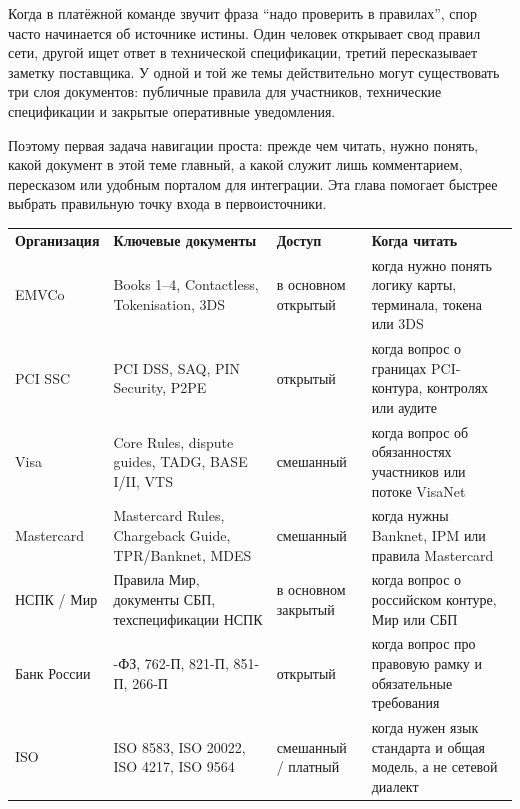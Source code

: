 
\label{ch:primary-sources}
Когда в платёжной команде звучит фраза \enquote{надо проверить
в правилах}, спор часто начинается об источнике истины. Один человек
открывает свод правил сети, другой ищет ответ
в технической спецификации, третий пересказывает заметку поставщика.
У одной и той же темы действительно могут существовать три слоя
документов: публичные правила для участников, технические
спецификации и закрытые оперативные уведомления.

Поэтому первая задача навигации проста: прежде чем читать, нужно
понять, какой документ в этой теме главный, а какой служит лишь
комментарием, пересказом или удобным порталом для интеграции. Эта
глава помогает быстрее выбрать
правильную точку входа в первоисточники.

\begin{table}[tbp]
  \centering
  \begingroup
  \small
  \setlength{\tabcolsep}{4pt}
  \renewcommand{\arraystretch}{1.15}
  \begin{tabularx}{\textwidth}{
      >{\RaggedRight\arraybackslash}p{2.0cm}
      >{\RaggedRight\arraybackslash}X
      >{\RaggedRight\arraybackslash}p{2.8cm}
      >{\RaggedRight\arraybackslash}X
    }
    \textbf{Организация} & \textbf{Ключевые документы}
    & \textbf{Доступ}     & \textbf{Когда читать}
    \\
    EMVCo                & Books 1--4, Contactless, Tokenisation, 3DS
    & в основном открытый & когда нужно понять логику карты,
    терминала, токена или 3DS      \\
    PCI SSC              & PCI DSS, SAQ, PIN Security, P2PE
    & открытый            & когда вопрос о границах PCI-контура,
    контролях или аудите       \\
    Visa                 & Core Rules, dispute guides, TADG, BASE
    I/II, VTS      & смешанный           & когда вопрос об
    обязанностях участников или потоке VisaNet      \\
    Mastercard           & Mastercard Rules, Chargeback Guide,
    TPR/Banknet, MDES & смешанный           & когда нужны Banknet,
    IPM или правила Mastercard                 \\
    НСПК / Мир           & Правила Мир, документы СБП,
    техспецификации НСПК      & в основном закрытый & когда вопрос о
    российском контуре, Мир или СБП                  \\
    Банк России          & 161-ФЗ, 762-П, 821-П, 851-П, 266-П
    & открытый            & когда вопрос про правовую рамку и
    обязательные требования       \\
    ISO                  & ISO 8583, ISO 20022, ISO 4217, ISO 9564
    & смешанный / платный & когда нужен язык стандарта и общая
    модель, а не сетевой диалект \\
  \end{tabularx}
  \endgroup
\end{table}

